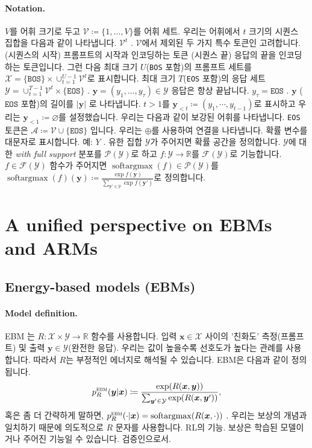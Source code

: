 \documentclass{article}
\def\x{{\bm{x}}}
\def\y{{\bm{y}}}
\def\RR{{\mathbb{R}}}
\def\cA{{\mathcal{A}}}
\def\cF{{\mathcal{F}}}
\def\cP{{\mathcal{P}}}
\def\cV{{\mathcal{V}}}
\def\cX{{\mathcal{X}}}
\def\cY{{\mathcal{Y}}}
\def\ebm{{\textsc{ebm}}}
\def\softargmax{{\operatorname{softargmax}}}
\def\bos{\texttt{BOS}\xspace}
\def\eos{\texttt{EOS}\xspace}
\def\voc{\cV}
\def\augvoc{\cA}
\begin{document}
\paragraph{Notation.}

$V$를 어휘 크기로 두고 $\voc \coloneqq \{1, \ldots, V\}$를
어휘 세트.  우리는 어휘에서 $t$ 크기의 시퀀스 집합을 다음과 같이 나타냅니다.
 $\voc^t$ .  $\voc$에서 제외된 두 가지 특수 토큰인  고려합니다. 
(시퀀스의 시작) 프롬프트의 시작과  인코딩하는 토큰 
(시퀀스 끝) 응답의 끝을 인코딩하는 토큰입니다.
그런 다음 최대 크기 $U$(\bos 포함)의 프롬프트 세트를 $\cX =
\{\bos\} \times \cup_{t=1}^{U-1} \voc^t$로 표시합니다.
최대 크기 $T$(\eos 포함)의 응답 세트 
 $\cY = \cup_{t=1}^{T-1} \voc^t \times \{\eos\}$ . 
$\y = (y_1, \dots, y_\tau) \in \cY$ 응답은 항상  끝납니다.
 $y_\tau = \eos$ .  $\y$ ($\eos$ 포함)의 길이를 $|\y|$ 로 나타냅니다.
$t > 1$를 $\y_{<t} \coloneqq (y_1, \cdots, y_{t-1})$로 표시하고
우리는 $\y_{<1} \coloneqq \varnothing $를 설정했습니다. 우리는 다음과 같이 보강된 어휘를 나타냅니다.
\eos 토큰은 $\augvoc \coloneqq \cV \cup \{\eos\}$ 입니다.  우리는 $\oplus$를 사용하여
연결을 나타냅니다.  확률 변수를 대문자로 표시합니다. 예:
 $Y$ .  유한 집합 $\cY$가 주어지면 확률 공간을 정의합니다.
$\cY$에 대한 \textit{with full support} 분포를 $\cP(\cY)$로 하고
$f \colon \cY \to \RR$를 $\cF(\cY)$로 기능합니다.  $f \in
\cF(\cY)$ 함수가 주어지면 $\softargmax(f) \in \cP(\cY)$를 $\softargmax(f)(\y)
\coloneqq \frac{\exp f(\y)}{ \sum_{\y' \in \cY} \exp f(\y')}$로 정의합니다.

\section{A unified perspective on EBMs and ARMs} 
 \label{sec:unified_perspective}

\subsection{Energy-based models (EBMs)}

\paragraph{Model definition.}

EBM \citep{ackley1985learning,lecun2006tutorial}는 $R \colon \cX
\times \cY \to \RR$ 함수를 사용합니다.
입력 $\x \in \cX$ 사이의 '친화도' 측정(프롬프트) 
및 출력 $\y \in \cY$(완전한 응답).
우리는 값이 높을수록 선호도가 높다는 관례를 사용합니다.
따라서 $R$는 부정적인 에너지로 해석될 수 있습니다.
EBM은 다음과 같이 정의됩니다.
 \begin{equation} 
p^ \ebm _R( \y | \x ) 
 \coloneqq \frac{\exp(R(\x, \y))} { \sum _{ \y ' \in \cY } \exp (R( \x , \y '))},
 \label{eq:ebm_def} 
 \end{equation} 
혹은 좀 더 간략하게 말하면,
 $p^\ebm_R(\cdot|\x) = \mathrm{softargmax}(R(\x, \cdot))$ .
우리는 보상의 개념과 일치하기 때문에 의도적으로 $R$ 문자를 사용합니다.
RL의 기능.  보상은 학습된 모델이거나 주어진 기능일 수 있습니다.
검증인으로서.
\end{document}
